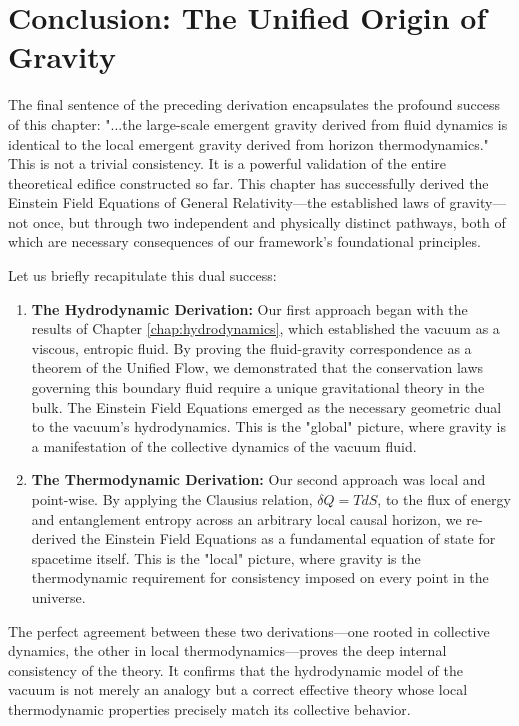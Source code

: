 \documentclass[11pt, letterpaper]{report}
\theoremstyle{plain} %
\theoremstyle{definition} %
\theoremstyle{remark} %
\begin{document}
\section{Conclusion: The Unified Origin of Gravity}
\label{sec:gravity_conclusion_unified}

The final sentence of the preceding derivation encapsulates the profound success of this chapter: "...the large-scale emergent gravity derived from fluid dynamics is identical to the local emergent gravity derived from horizon thermodynamics." This is not a trivial consistency. It is a powerful validation of the entire theoretical edifice constructed so far. This chapter has successfully derived the Einstein Field Equations of General Relativity—the established laws of gravity—not once, but through two independent and physically distinct pathways, both of which are necessary consequences of our framework's foundational principles.

Let us briefly recapitulate this dual success:
\begin{enumerate}
    \item \textbf{The Hydrodynamic Derivation:} Our first approach began with the results of Chapter \ref{chap:hydrodynamics}, which established the vacuum as a viscous, entropic fluid. By proving the fluid-gravity correspondence as a theorem of the Unified Flow, we demonstrated that the conservation laws governing this boundary fluid require a unique gravitational theory in the bulk. The Einstein Field Equations emerged as the necessary geometric dual to the vacuum's hydrodynamics. This is the "global" picture, where gravity is a manifestation of the collective dynamics of the vacuum fluid.

    \item \textbf{The Thermodynamic Derivation:} Our second approach was local and point-wise. By applying the Clausius relation, $\delta Q = T dS$, to the flux of energy and entanglement entropy across an arbitrary local causal horizon, we re-derived the Einstein Field Equations as a fundamental equation of state for spacetime itself. This is the "local" picture, where gravity is the thermodynamic requirement for consistency imposed on every point in the universe.
\end{enumerate}

The perfect agreement between these two derivations—one rooted in collective dynamics, the other in local thermodynamics—proves the deep internal consistency of the theory. It confirms that the hydrodynamic model of the vacuum is not merely an analogy but a correct effective theory whose local thermodynamic properties precisely match its collective behavior.
\end{document}
